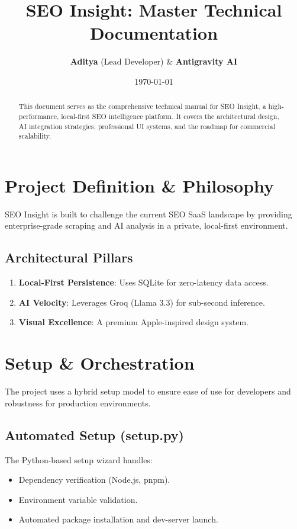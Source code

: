 \documentclass[11pt,a4paper]{article}
\title{\textbf{SEO Insight: Master Technical Documentation}}
\author{\textbf{Aditya} (Lead Developer) \& \textbf{Antigravity AI}}
\date{\today}
\begin{document}
\maketitle
\begin{abstract}
    This document serves as the comprehensive technical manual for SEO Insight, a high-performance, local-first SEO intelligence platform. It covers the architectural design, AI integration strategies, professional UI systems, and the roadmap for commercial scalability.
\end{abstract}

\newpage
\tableofcontents
\newpage

\section{Project Definition \& Philosophy}
SEO Insight is built to challenge the current SEO SaaS landscape by providing enterprise-grade scraping and AI analysis in a private, local-first environment. 

\subsection{Architectural Pillars}
\begin{enumerate}
    \item \textbf{Local-First Persistence}: Uses SQLite for zero-latency data access.
    \item \textbf{AI Velocity}: Leverages Groq (Llama 3.3) for sub-second inference.
    \item \textbf{Visual Excellence}: A premium Apple-inspired design system.
\end{enumerate}

\section{Setup \& Orchestration}
The project uses a hybrid setup model to ensure ease of use for developers and robustness for production environments.

\subsection{Automated Setup (setup.py)}
The Python-based setup wizard handles:
\begin{itemize}
    \item Dependency verification (Node.js, pnpm).
    \item Environment variable validation.
    \item Automated package installation and dev-server launch.
\end{itemize}
\end{document}
